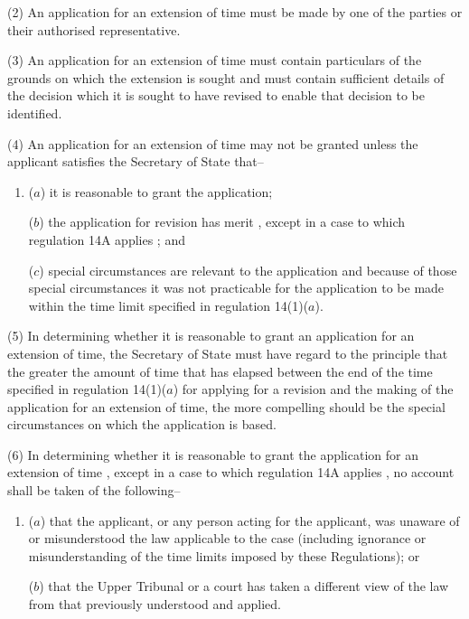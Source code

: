\documentclass[12pt,a4paper]{article}
\begin{document}
(2) An application for an extension of time must be made by one of the parties or their authorised representative.

(3) An application for an extension of time must contain particulars of the grounds on which the extension is sought and must contain sufficient details of the decision which it is sought to have revised to enable that decision to be identified.

(4) An application for an extension of time may not be granted unless the applicant satisfies the Secretary of State that–
\begin{enumerate}\item[]
($a$) it is reasonable to grant the application;

($b$) the application for revision has merit%
, except in a case to which regulation 14A applies%
; and

($c$) special circumstances are relevant to the application and because of those special circumstances it was not practicable for the application to be made within the time limit specified in regulation 14(1)($a$).
\end{enumerate}

(5) In determining whether it is reasonable to grant an application for an extension of time, the Secretary of State must have regard to the principle that the greater the amount of time that has elapsed between the end of the time specified in regulation 14(1)($a$)  for applying for a revision and the making of the application for an extension of time, the more compelling should be the special circumstances on which the application is based.

(6) In determining whether it is reasonable to grant the application for an extension of time%
, except in a case to which regulation 14A applies%
, no account shall be taken of the following–
\begin{enumerate}\item[]
($a$) that the applicant, or any person acting for the applicant, was unaware of or misunderstood the law applicable to the case (including ignorance or misunderstanding of the time limits imposed by these Regulations); or

($b$) that the Upper Tribunal or a court has taken a different view of the law from that previously understood and applied.
\end{enumerate}
\end{document}

